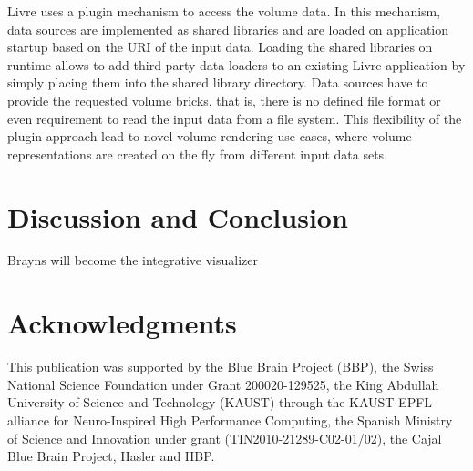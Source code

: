\documentclass[10pt]{llncs}
\newcommand{\FIXME}[1]{\textbf{\color{BLUE}{FIXME: #1}}}
\begin{document}
Livre uses a plugin mechanism to access the volume data. In this mechanism, data
sources are implemented as shared libraries and are loaded on application
startup based on the URI of the input data. Loading the shared libraries on
runtime allows to add third-party data loaders to an existing Livre application
by simply placing them into the shared library directory. Data sources have to
provide the requested volume bricks, that is, there is no defined file format or
even requirement to read the input data from a file system. This flexibility of
the plugin approach lead to novel volume rendering use cases, where volume
representations are created on the fly from different input data sets.

\FIXME{teaser gallery}

\section{Discussion and Conclusion}
\label{sec:conclusions}

Brayns will become the integrative visualizer

\section*{Acknowledgments}
This publication was supported by the Blue Brain Project (BBP), the Swiss
National Science Foundation under Grant 200020-129525, the King Abdullah
University of Science and Technology (KAUST) through the KAUST-EPFL alliance for
Neuro-Inspired High Performance Computing, the Spanish Ministry of Science and
Innovation under grant (TIN2010-21289-C02-01/02), the Cajal Blue Brain Project,
Hasler and HBP.





\end{document}
